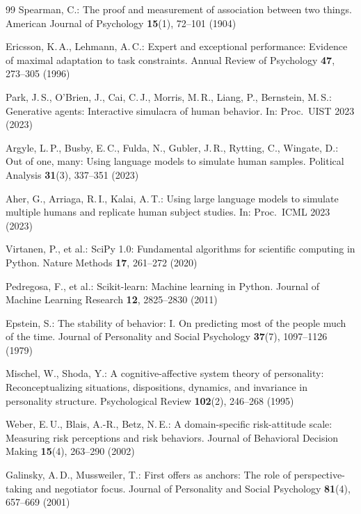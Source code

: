\documentclass[11pt,a4paper]{article}
\begin{document}
\begin{thebibliography}{99}
Spearman, C.:
The proof and measurement of association between two things.
American Journal of Psychology \textbf{15}(1), 72--101 (1904)

Ericsson, K.\,A., Lehmann, A.\,C.:
Expert and exceptional performance: Evidence of maximal adaptation to
task constraints.
Annual Review of Psychology \textbf{47}, 273--305 (1996)

Park, J.\,S., O'Brien, J., Cai, C.\,J., Morris, M.\,R., Liang, P.,
Bernstein, M.\,S.:
Generative agents: Interactive simulacra of human behavior.
In: Proc.\ UIST 2023 (2023)

Argyle, L.\,P., Busby, E.\,C., Fulda, N., Gubler, J.\,R., Rytting, C.,
Wingate, D.:
Out of one, many: Using language models to simulate human samples.
Political Analysis \textbf{31}(3), 337--351 (2023)

Aher, G., Arriaga, R.\,I., Kalai, A.\,T.:
Using large language models to simulate multiple humans and replicate
human subject studies.
In: Proc.\ ICML 2023 (2023)

Virtanen, P., et al.:
SciPy 1.0: Fundamental algorithms for scientific computing in Python.
Nature Methods \textbf{17}, 261--272 (2020)

Pedregosa, F., et al.:
Scikit-learn: Machine learning in Python.
Journal of Machine Learning Research \textbf{12}, 2825--2830 (2011)

Epstein, S.:
The stability of behavior: I. On predicting most of the people much of
the time.
Journal of Personality and Social Psychology \textbf{37}(7), 1097--1126
(1979)

Mischel, W., Shoda, Y.:
A cognitive-affective system theory of personality: Reconceptualizing
situations, dispositions, dynamics, and invariance in personality
structure.
Psychological Review \textbf{102}(2), 246--268 (1995)

Weber, E.\,U., Blais, A.-R., Betz, N.\,E.:
A domain-specific risk-attitude scale: Measuring risk perceptions and
risk behaviors.
Journal of Behavioral Decision Making \textbf{15}(4), 263--290 (2002)

Galinsky, A.\,D., Mussweiler, T.:
First offers as anchors: The role of perspective-taking and negotiator
focus.
Journal of Personality and Social Psychology \textbf{81}(4), 657--669
(2001)


\end{thebibliography}
\end{document}
